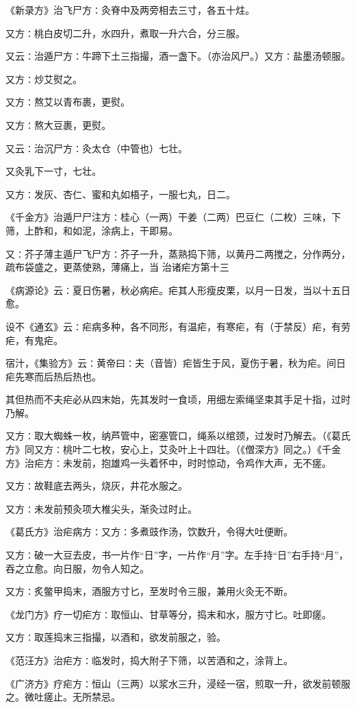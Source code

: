 \documentclass[a4paper,12pt,UTF8,twoside]{ctexbook}
\begin{document}
《新录方》治飞尸方∶灸脊中及两旁相去三寸，各五十炷。

又方∶桃白皮切二升，水四升，煮取一升六合，分三服。

又云∶治遁尸方∶牛蹄下土三指撮，酒一盏下。（亦治风尸。）又方∶盐墨汤顿服。

又方∶炒艾熨之。

又方∶熬艾以青布裹，更熨。

又方∶熬大豆裹，更熨。

又云∶治沉尸方∶灸太仓（中管也）七壮。

又灸乳下一寸，七壮。

又方∶发灰、杏仁、蜜和丸如梧子，一服七丸，日二。

《千金方》治遁尸尸注方∶桂心（一两）干姜（二两）巴豆仁（二枚）三味，下筛，上酢和，和如泥，涂病上，干即易。

又∶芥子薄主遁尸飞尸方∶芥子一升，蒸熟捣下筛，以黄丹二两搅之，分作两分，疏布袋盛之，更蒸使熟，薄痛上，当
治诸疟方第十三

《病源论》云∶夏日伤暑，秋必病疟。疟其人形瘦皮栗，以月一日发，当以十五日愈。

设不《通玄》云∶疟病多种，各不同形，有温疟，有寒疟，有（于禁反）疟，有劳疟，有鬼疟。

宿汁，《集验方》云∶黄帝曰∶夫（音皆）疟皆生于风，夏伤于暑，秋为疟。间日疟先寒而后热后热也。

其但热而不夫疟必从四末始，先其发时一食顷，用细左索绳坚束其手足十指，过时乃解。

又方∶取大蜘蛛一枚，纳芦管中，密塞管口，绳系以绾颈，过发时乃解去。（《葛氏方》同又方∶桃叶二七枚，安心上，艾灸叶上十四壮。（《僧深方》同之。）《千金方》治疟方∶未发前，抱雄鸡一头着怀中，时时惊动，令鸡作大声，无不瘥。

又方∶故鞋底去两头，烧灰，井花水服之。

又方∶未发前预灸项大椎尖头，渐灸过时止。

《葛氏方》治疟病方∶又方∶多煮豉作汤，饮数升，令得大吐便断。

又方∶破一大豆去皮，书一片作“日”字，一片作“月”字。左手持“日”右手持“月”，吞之立愈。向日服，勿令人知之。

又方∶炙鳖甲捣末，酒服方寸匕，至发时令三服，兼用火灸无不断。

《龙门方》疗一切疟方∶取恒山、甘草等分，捣末和水，服方寸匕。吐即瘥。

又方∶取莲捣末三指撮，以酒和，欲发前服之，验。

《范汪方》治疟方∶临发时，捣大附子下筛，以苦酒和之，涂背上。

《广济方》疗疟方∶恒山（三两）以浆水三升，浸经一宿，煎取一升，欲发前顿服之。微吐瘥止。无所禁忌。
\end{document}
